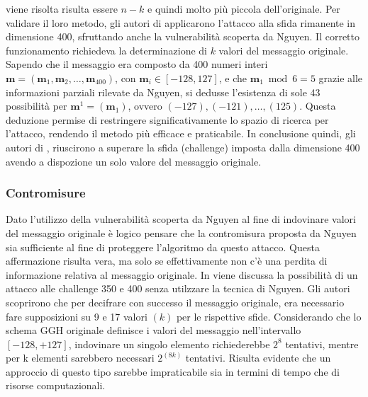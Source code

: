 viene risolta risulta essere $n-k$ e quindi molto più piccola dell'originale.  
Per validare il loro metodo, gli autori di \cite{Nguyen400} applicarono l'attacco alla
sfida rimanente in dimensione 400, sfruttando anche la vulnerabilità scoperta da Nguyen. 
Il corretto funzionamento richiedeva la determinazione di $k$ valori del messaggio originale. 
Sapendo che il messaggio era composto da 400 numeri interi 
$\mathbf{m} = (\mathbf{m}_1, \mathbf{m}_2,\dots, \mathbf{m}_{400})$, 
con $\mathbf{m}_i \in [-128, 127]$, e che $\mathbf{m}_1 \bmod 6 = 5$ 
grazie alle informazioni parziali rilevate da Nguyen, si dedusse l'esistenza di sole 43 possibilità 
per $\mathbf{m}^1 = (\mathbf{m}_1)$, ovvero $(-127), (-121), \dots, (125)$. 
Questa deduzione permise di restringere significativamente lo spazio di ricerca per 
l'attacco, rendendo il metodo più efficace e praticabile.
In conclusione quindi, gli autori di \cite{Nguyen400}, riuscirono a superare la sfida (challenge) 
imposta dalla dimensione 400 avendo a dispozione un solo valore del messaggio originale.

\subsubsection{Contromisure}
Dato l'utilizzo della vulnerabilità scoperta da Nguyen al fine di indovinare valori del
messaggio originale è logico pensare che la contromisura proposta da Nguyen sia sufficiente
al fine di proteggere l'algoritmo da questo attacco. Questa affermazione risulta vera, ma solo
se effettivamente non c'è una perdita di informazione relativa al messaggio originale. 
In \cite{Nguyen400} viene discussa la possibilità di un attacco alle challenge 350 e 400
senza utilzzare la tecnica di Nguyen. 
Gli autori scoprirono che per decifrare con successo il messaggio originale, era necessario 
fare supposizioni su 9 e 17 valori $(k)$ per le rispettive sfide. Considerando che lo schema 
GGH originale definisce i valori del messaggio nell'intervallo $[-128, +127]$, indovinare un 
singolo elemento richiederebbe $2^8$ tentativi, mentre per k elementi sarebbero necessari 
$2^{(8k)}$ tentativi. Risulta evidente che un approccio di questo tipo sarebbe impraticabile 
sia in termini di tempo che di risorse computazionali.